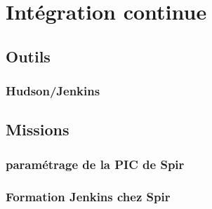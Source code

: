 \section{Intégration continue}

\subsection{Outils}

\subsubsection{Hudson/Jenkins}

\subsection{Missions}

\subsubsection{paramétrage de la PIC de Spir}

\subsubsection{Formation Jenkins chez Spir}


